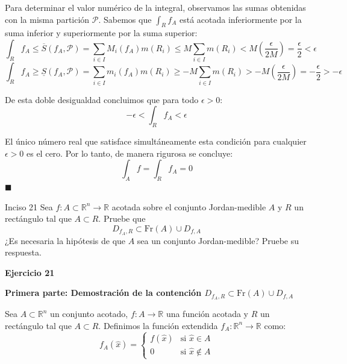 \documentclass[11pt,letterpaper]{article}
\begin{document}
Para determinar el valor numérico de la integral, observamos las sumas obtenidas con la misma partición $\mathcal{P}$. Sabemos que $\int_R f_A$ está acotada inferiormente por la suma inferior y superiormente por la suma superior:
\begin{equation*}
\int_R f_A \le \overline{S}(f_A, \mathcal{P}) = \sum_{i \in I} M_i(f_A) m(R_i) \le M \sum_{i \in I} m(R_i) < M \left(\frac{\epsilon}{2M}\right) = \frac{\epsilon}{2} < \epsilon
\end{equation*}
\begin{equation*}
\int_R f_A \ge \underline{S}(f_A, \mathcal{P}) = \sum_{i \in I} m_i(f_A) m(R_i) \ge -M \sum_{i \in I} m(R_i) > -M \left(\frac{\epsilon}{2M}\right) = -\frac{\epsilon}{2} > -\epsilon
\end{equation*}

De esta doble desigualdad concluimos que para todo $\epsilon > 0$:
\begin{equation*}
-\epsilon < \int_R f_A < \epsilon
\end{equation*}

El único número real que satisface simultáneamente esta condición para cualquier $\epsilon > 0$ es el cero. Por lo tanto, de manera rigurosa se concluye:
\begin{equation*}
\int_A f = \int_R f_A = 0
\end{equation*}
\hfill $\blacksquare$

\begin{inciso}{Inciso 21}
Sea $f:A\subset\mathbb{R}^{n}\rightarrow\mathbb{R}$ acotada sobre el conjunto Jordan-medible $A$ y $R$ un rectángulo tal que $A\subset R$. Pruebe que
\begin{equation*}
    D_{f_{A},R}\subset \text{Fr}(A)\cup D_{f,A}
\end{equation*}
¿Es necesaria la hipótesis de que $A$ sea un conjunto Jordan-medible? Pruebe su respuesta.
\end{inciso}

\textbf{Ejercicio 21}

\textbf{Primera parte: Demostración de la contención $D_{f_A, R} \subset \text{Fr}(A) \cup D_{f, A}$}

Sea $A \subset \mathbb{R}^n$ un conjunto acotado, $f: A \rightarrow \mathbb{R}$ una función acotada y $R$ un rectángulo tal que $A \subset R$. Definimos la función extendida $f_A: \mathbb{R}^n \rightarrow \mathbb{R}$ como:
\begin{equation*}
f_A(\hat{x}) = 
\begin{cases} 
f(\hat{x}) & \text{si } \hat{x} \in A \\ 
0 & \text{si } \hat{x} \notin A 
\end{cases}
\end{equation*}
\end{document}
